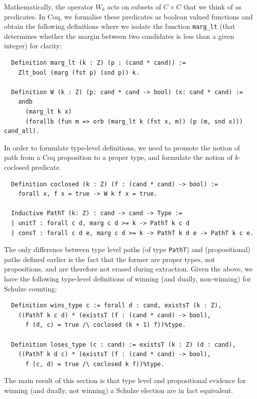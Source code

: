 \noindent
Mathematically, the operator $W_k$ acts on subsets of $C \times C$
that we think of as predicates. In Coq, we formalise these
predicates as boolean valued functions and obtain the following
definitions where we isolate the function \texttt{marg\_lt} (that
determines whether the margin between two candidates is less than a
given integer) for clarity:

\begin{verbatim}
  Definition marg_lt (k : Z) (p : (cand * cand)) :=
    Zlt_bool (marg (fst p) (snd p)) k.

  Definition W (k : Z) (p: cand * cand -> bool) (x: cand * cand) :=
    andb
      (marg_lt k x)
      (forallb (fun m => orb (marg_lt k (fst x, m)) (p (m, snd x))) cand_all).

\end{verbatim}
\noindent
In order to formulate type-level definitions, we need to promote the
notion of path from a Coq proposition to a proper type, and
formulate the notion of $k$-coclosed predicate.

\begin{verbatim}
  Definition coclosed (k : Z) (f : (cand * cand) -> bool) :=
    forall x, f x = true -> W k f x = true.

  Inductive PathT (k: Z) : cand -> cand -> Type :=
  | unitT : forall c d, marg c d >= k -> PathT k c d
  | consT : forall c d e, marg c d >= k -> PathT k d e -> PathT k c e.
\end{verbatim}

\noindent
The only difference between type level paths (of type
\texttt{PathT}) and (propositional) paths defined earlier is the
fact that the former are proper types, not propositions, and are
therefore not erased during extraction. Given the above, we have the
following type-level definitions of winning (and dually,
non-winning) for Schulze counting:

\begin{verbatim}
  Definition wins_type c := forall d : cand, existsT (k : Z),
    ((PathT k c d) * (existsT (f : (cand * cand) -> bool),
      f (d, c) = true /\ coclosed (k + 1) f))%type.

  Definition loses_type (c : cand) := existsT (k : Z) (d : cand),
    ((PathT k d c) * (existsT (f : (cand * cand) -> bool),
      f (c, d) = true /\ coclosed k f))%type.

\end{verbatim}

\noindent
The main result of this section is that type level and propositional
evidence for winning (and dually, not winning) a Schulze election
are in fact equivalent.

